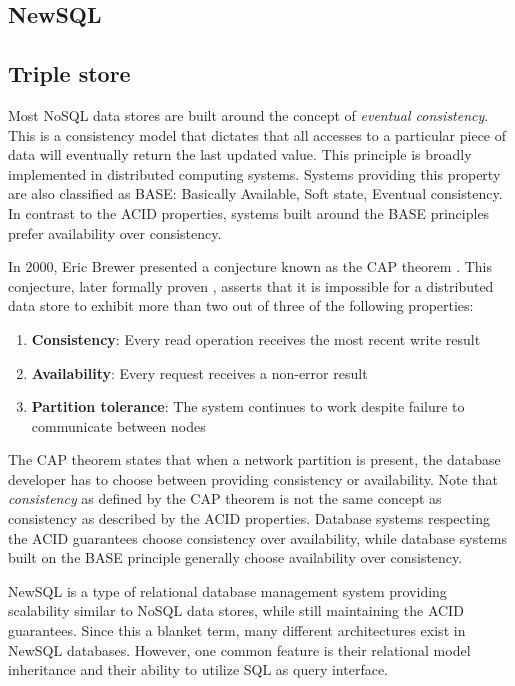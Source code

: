 \subsection{NewSQL}
\label{subsec:newsql}


\subsection{Triple store}
\label{subsec:triple-store}


Most NoSQL data stores are built around the concept of \textit{eventual consistency}.
This is a consistency model that dictates that all accesses to a particular piece of data will eventually return the last updated value.
This principle is broadly implemented in distributed computing systems.
Systems providing this property are also classified as BASE: Basically Available, Soft state, Eventual consistency.
In contrast to the ACID properties, systems built around the BASE principles prefer availability over consistency.

In 2000, Eric Brewer presented a conjecture known as the CAP theorem \autocite{Brewer2000}.
This conjecture, later formally proven \autocite{GilbertLynch2002}, asserts that it is impossible for a distributed data store to exhibit more than two out of three of the following properties:

\begin{enumerate}
  \item \textbf{Consistency}: Every read operation receives the most recent write result
  \item \textbf{Availability}: Every request receives a non-error result
  \item \textbf{Partition tolerance}: The system continues to work despite failure to communicate between nodes
\end{enumerate}

The CAP theorem states that when a network partition is present, the database developer has to choose between providing consistency or availability.
Note that \textit{consistency} as defined by the CAP theorem is not the same concept as consistency as described by the ACID properties.
Database systems respecting the ACID guarantees choose consistency over availability, while database systems built on the BASE principle generally choose availability over consistency.

NewSQL is a type of relational database management system providing scalability similar to NoSQL data stores, while still maintaining the ACID guarantees.
Since this a blanket term, many different architectures exist in NewSQL databases.
However, one common feature is their relational model inheritance and their ability to utilize SQL as query interface.

